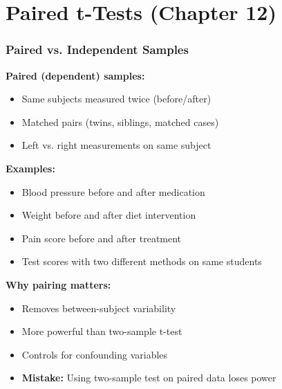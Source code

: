 \documentclass{beamer}
\begin{document}
\section{Paired t-Tests (Chapter 12)}

\begin{frame}
\frametitle{Paired vs. Independent Samples}
\textbf{Paired (dependent) samples:}
\begin{itemize}
\item Same subjects measured twice (before/after)
\item Matched pairs (twins, siblings, matched cases)
\item Left vs. right measurements on same subject
\end{itemize}

\vspace{0.5cm}
\textbf{Examples:}
\begin{itemize}
\item Blood pressure before and after medication
\item Weight before and after diet intervention
\item Pain score before and after treatment
\item Test scores with two different methods on same students
\end{itemize}

\vspace{0.5cm}
\textbf{Why pairing matters:}
\begin{itemize}
\item Removes between-subject variability
\item More powerful than two-sample t-test
\item Controls for confounding variables
\item \textbf{Mistake:} Using two-sample test on paired data loses power
\end{itemize}
\end{frame}
\end{document}
